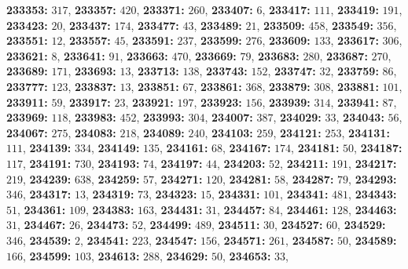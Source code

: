 \textsf{\bfseries 233353:} $317$, \textsf{\bfseries 233357:} $420$, \textsf{\bfseries 233371:} $260$, \textsf{\bfseries 233407:} $6$, \textsf{\bfseries 233417:} $111$, \textsf{\bfseries 233419:} $191$, \textsf{\bfseries 233423:} $20$, \textsf{\bfseries 233437:} $174$, \textsf{\bfseries 233477:} $43$, \textsf{\bfseries 233489:} $21$, \textsf{\bfseries 233509:} $458$, \textsf{\bfseries 233549:} $356$, \textsf{\bfseries 233551:} $12$, \textsf{\bfseries 233557:} $45$, \textsf{\bfseries 233591:} $237$, \textsf{\bfseries 233599:} $276$, \textsf{\bfseries 233609:} $133$, \textsf{\bfseries 233617:} $306$, \textsf{\bfseries 233621:} $8$, \textsf{\bfseries 233641:} $91$, \textsf{\bfseries 233663:} $470$, \textsf{\bfseries 233669:} $79$, \textsf{\bfseries 233683:} $280$, \textsf{\bfseries 233687:} $270$, \textsf{\bfseries 233689:} $171$, \textsf{\bfseries 233693:} $13$, \textsf{\bfseries 233713:} $138$, \textsf{\bfseries 233743:} $152$, \textsf{\bfseries 233747:} $32$, \textsf{\bfseries 233759:} $86$, \textsf{\bfseries 233777:} $123$, \textsf{\bfseries 233837:} $13$, \textsf{\bfseries 233851:} $67$, \textsf{\bfseries 233861:} $368$, \textsf{\bfseries 233879:} $308$, \textsf{\bfseries 233881:} $101$, \textsf{\bfseries 233911:} $59$, \textsf{\bfseries 233917:} $23$, \textsf{\bfseries 233921:} $197$, \textsf{\bfseries 233923:} $156$, \textsf{\bfseries 233939:} $314$, \textsf{\bfseries 233941:} $87$, \textsf{\bfseries 233969:} $118$, \textsf{\bfseries 233983:} $452$, \textsf{\bfseries 233993:} $304$, \textsf{\bfseries 234007:} $387$, \textsf{\bfseries 234029:} $33$, \textsf{\bfseries 234043:} $56$, \textsf{\bfseries 234067:} $275$, \textsf{\bfseries 234083:} $218$, \textsf{\bfseries 234089:} $240$, \textsf{\bfseries 234103:} $259$, \textsf{\bfseries 234121:} $253$, \textsf{\bfseries 234131:} $111$, \textsf{\bfseries 234139:} $334$, \textsf{\bfseries 234149:} $135$, \textsf{\bfseries 234161:} $68$, \textsf{\bfseries 234167:} $174$, \textsf{\bfseries 234181:} $50$, \textsf{\bfseries 234187:} $117$, \textsf{\bfseries 234191:} $730$, \textsf{\bfseries 234193:} $74$, \textsf{\bfseries 234197:} $44$, \textsf{\bfseries 234203:} $52$, \textsf{\bfseries 234211:} $191$, \textsf{\bfseries 234217:} $219$, \textsf{\bfseries 234239:} $638$, \textsf{\bfseries 234259:} $57$, \textsf{\bfseries 234271:} $120$, \textsf{\bfseries 234281:} $58$, \textsf{\bfseries 234287:} $79$, \textsf{\bfseries 234293:} $346$, \textsf{\bfseries 234317:} $13$, \textsf{\bfseries 234319:} $73$, \textsf{\bfseries 234323:} $15$, \textsf{\bfseries 234331:} $101$, \textsf{\bfseries 234341:} $481$, \textsf{\bfseries 234343:} $51$, \textsf{\bfseries 234361:} $109$, \textsf{\bfseries 234383:} $163$, \textsf{\bfseries 234431:} $31$, \textsf{\bfseries 234457:} $84$, \textsf{\bfseries 234461:} $128$, \textsf{\bfseries 234463:} $31$, \textsf{\bfseries 234467:} $26$, \textsf{\bfseries 234473:} $52$, \textsf{\bfseries 234499:} $489$, \textsf{\bfseries 234511:} $30$, \textsf{\bfseries 234527:} $60$, \textsf{\bfseries 234529:} $346$, \textsf{\bfseries 234539:} $2$, \textsf{\bfseries 234541:} $223$, \textsf{\bfseries 234547:} $156$, \textsf{\bfseries 234571:} $261$, \textsf{\bfseries 234587:} $50$, \textsf{\bfseries 234589:} $166$, \textsf{\bfseries 234599:} $103$, \textsf{\bfseries 234613:} $288$, \textsf{\bfseries 234629:} $50$, \textsf{\bfseries 234653:} $33$, 
